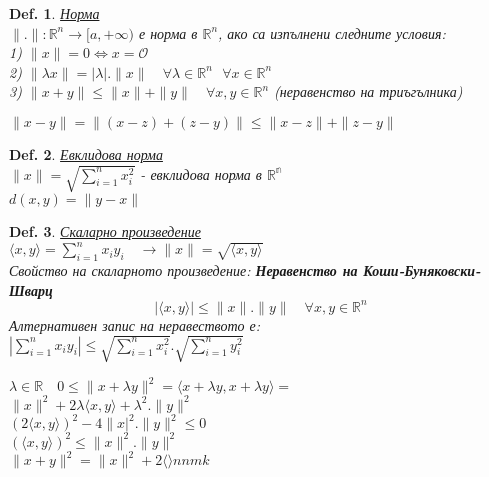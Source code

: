 \documentclass[12pt]{article}
\newtheorem{definition}{Def.}
\newcommand{\spc}{\text{ }}
\begin{document}
	\begin{definition}
		\underline{Норма}\\
		$\|.\|:\mathbb{R}^n \rightarrow [a,+\infty)$ е норма в $\mathbb{R}^n$, ако са изпълнени следните условия:\\
		1) $\|x\|=0 \Leftrightarrow x=\mathcal{O}$\\
		2) $\|\lambda x\| = |\lambda|.\|x\|\quad\forall\lambda\in\mathbb{R}^n\spc\forall x \in\mathbb{R}^n$\\
		3) $\|x+y\|\leq \|x\|+\|y\|\quad\forall x,y \in\mathbb{R}^n$ (неравенство на триъгълника)
	\end{definition}
	$\|x-y\|=\|(x-z)+(z-y)\|\leq\|x-z\|+\|z-y\|$
	\begin{definition}
		\underline{Евклидова норма}\\
		$\|x\|=\sqrt{\sum_{i=1}^{n}x_i^2}$ - евклидова норма в $\mathbb{R^n}$\\
		$d(x,y) = \|y-x\|$
	\end{definition}
	\begin{definition}
		\underline{Скаларно произведение}\\
		$\langle x,y \rangle = \sum_{i=1}^{n}x_i y_i\quad \rightarrow \|x\| = \sqrt{\langle x, y \rangle}$\\
		$\spc$\\
		Свойство на скаларното произведение: \textbf{Неравенство на Коши-Буняковски-Шварц}\\
		\[|\langle x, y \rangle| \leq \|x\|.\|y\|\quad \forall x,y \in \mathbb{R}^n\]
		$\spc$\\
		Алтернативен запис на неравеството е:\\
		$\left|\sum_{i=1}^{n}x_iy_i\right|\leq \sqrt{\sum_{i=1}^{n}x_i^2}.\sqrt{\sum_{i=1}^{n}y_i^2}$\\
		
	\end{definition}
	$\lambda\in\mathbb{R}\quad 0\leq\|x+\lambda y\|^2 = \langle x+\lambda y, x+\lambda y \rangle = $\\
	$\|x\|^2 + 2\lambda \langle x,y \rangle +\lambda^2.\|y\|^2$\\
	$(2\langle x,y \rangle)^2 - 4\|x |^2.\|y\|^2 \leq 0$\\
	$(\langle x,y \rangle)^2 \leq \|x\|^2.\|y\|^2$\\
	$\spc$\\
	$\|x+y\|^2 = \|x\|^2 + 2\langle \rangle nnmk$
\end{document}
